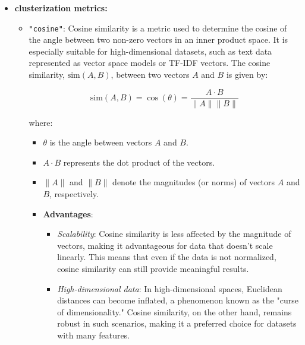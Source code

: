 \begin{itemize}
                \item \textbf{clusterization metrics:}
                \begin{itemize}
                    \item \texttt{"cosine"}: Cosine similarity is a metric used to determine the cosine of the angle between two non-zero vectors in an inner product space. It is especially suitable for high-dimensional datasets, such as text data represented as vector space models or TF-IDF vectors. The cosine similarity, \( \text{sim}(A, B) \), between two vectors \( A \) and \( B \) is given by:

                    
                    \begin{equation}
                    \text{sim}(A, B) = \cos(\theta) = \frac{A \cdot B}{\|A\| \|B\|}
                    \end{equation}
                    
                    where:
                    \begin{itemize}
                        \item \( \theta \) is the angle between vectors \( A \) and \( B \).
                        \item \( A \cdot B \) represents the dot product of the vectors.
                        \item \( \|A\| \) and \( \|B\| \) denote the magnitudes (or norms) of vectors \( A \) and \( B \), respectively.
                    \end{itemize}

                    \begin{itemize}
                        \item \textbf{Advantages}:
                        \begin{itemize}
                            \item \textit{Scalability}: Cosine similarity is less affected by the magnitude of vectors, making it advantageous for data that doesn't scale linearly. This means that even if the data is not normalized, cosine similarity can still provide meaningful results.
                            
                            \item \textit{High-dimensional data}: In high-dimensional spaces, Euclidean distances can become inflated, a phenomenon known as the "curse of dimensionality." Cosine similarity, on the other hand, remains robust in such scenarios, making it a preferred choice for datasets with many features.
                            

\end{itemize}
\end{itemize}
\end{itemize}
\end{itemize}
